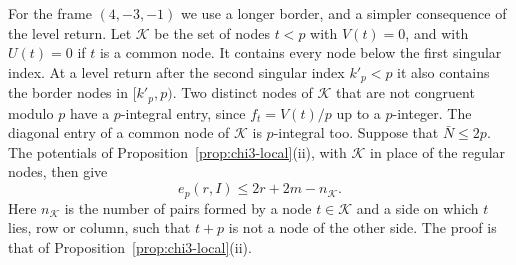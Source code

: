 \documentclass[11pt]{amsart}
\theoremstyle{definition}
\theoremstyle{remark}
\numberwithin{equation}{section}
\begin{document}
For the frame $(4,-3,-1)$ we use a longer border, and a simpler consequence of the level return. Let $\mathcal K$ be
the set of nodes $t<p$ with $V(t)=0$, and with $U(t)=0$ if $t$ is a common node. It contains every node below the
first singular index. At a level return after the second singular index $k'_p<p$ it also contains the border nodes in
$[k'_p,p)$. Two distinct nodes of $\mathcal K$ that are not congruent modulo $p$ have a $p$-integral entry, since
$f_t=V(t)/p$ up to a $p$-integer. The diagonal entry of a common node of $\mathcal K$ is $p$-integral too. Suppose that
$\bar N\le2p$. The potentials of Proposition~\ref{prop:chi3-local}(ii), with $\mathcal K$ in place of the regular
nodes, then give
\begin{equation}\label{eq:knownzero}
 e_p(r,I)\le2r+2m-n_{\mathcal K}.
\end{equation}
Here $n_{\mathcal K}$ is the number of pairs formed by a node $t\in\mathcal K$ and a side on which $t$ lies, row or
column, such that $t+p$ is not a node of the other side. The proof is that of Proposition~\ref{prop:chi3-local}(ii).
\end{document}
